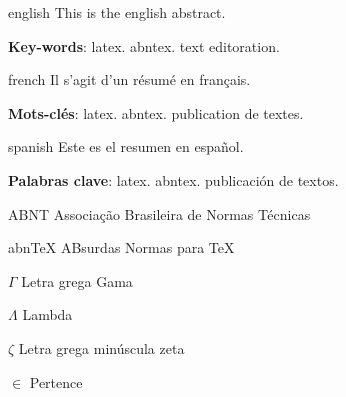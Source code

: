 \documentclass[
    12pt,               %
    openright,          %
    twoside,            %
    a4paper,            %
    english,            %
    french,             %
    spanish,            %
    brazil              %
    ]{abntex2}
\begin{document}
\begin{resumo}[Abstract]
 \begin{otherlanguage*}{english}
   This is the english abstract.

   \vspace{\onelineskip}
 
   \noindent 
   \textbf{Key-words}: latex. abntex. text editoration.
 \end{otherlanguage*}
\end{resumo}

\begin{resumo}[Résumé]
 \begin{otherlanguage*}{french}
    Il s'agit d'un résumé en français.
 
   \textbf{Mots-clés}: latex. abntex. publication de textes.
 \end{otherlanguage*}
\end{resumo}

\begin{resumo}[Resumen]
 \begin{otherlanguage*}{spanish}
   Este es el resumen en español.
  
   \textbf{Palabras clave}: latex. abntex. publicación de textos.
 \end{otherlanguage*}
\end{resumo}

\listoffigures*
\cleardoublepage

\listoftables*
\cleardoublepage

\begin{siglas}
  \item[ABNT] Associação Brasileira de Normas Técnicas
  \item[abnTeX] ABsurdas Normas para TeX
\end{siglas}

\begin{simbolos}
  \item[$ \Gamma $] Letra grega Gama
  \item[$ \Lambda $] Lambda
  \item[$ \zeta $] Letra grega minúscula zeta
  \item[$ \in $] Pertence
\end{simbolos}
\end{document}
